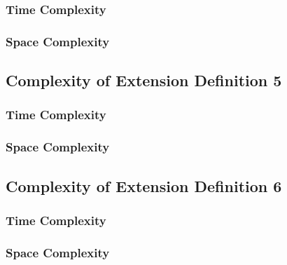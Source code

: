 \documentclass[conference]{IEEEtran}
\begin{document}
\subsubsection{Time Complexity}

\subsubsection{Space Complexity}

\subsection{Complexity of Extension Definition 5}

\subsubsection{Time Complexity}

\subsubsection{Space Complexity}

\subsection{Complexity of Extension Definition 6}

\subsubsection{Time Complexity}

\subsubsection{Space Complexity}



\onecolumn
\clearpage
\lstset{basicstyle=\ttfamily, breaklines=true}

\end{document}
